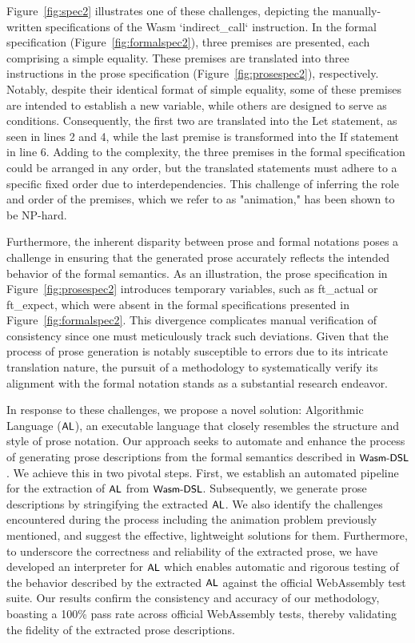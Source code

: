Figure~\ref{fig:spec2} illustrates one of these challenges, depicting the
manually-written specifications of the Wasm `indirect\_call` instruction. In
the formal specification (Figure~\ref{fig:formalspec2}), three premises are
presented, each comprising a simple equality. These premises are translated
into three instructions in the prose specification
(Figure~\ref{fig:prosespec2}), respectively. Notably, despite their identical
format of simple equality, some of these premises are intended to establish a
new variable, while others are designed to serve as conditions. Consequently,
the first two are translated into the Let statement, as seen in lines 2 and 4,
while the last premise is transformed into the If statement in line 6. Adding
to the complexity, the three premises in the formal specification could be
arranged in any order, but the translated statements must adhere to a specific
fixed order due to interdependencies. This challenge of inferring the role and
order of the premises, which we refer to as "animation," has been shown to be
NP-hard.

Furthermore, the inherent disparity between prose and formal notations poses a
challenge in ensuring that the generated prose accurately reflects the intended
behavior of the formal semantics. As an illustration, the prose specification
in Figure~\ref{fig:prosespec2} introduces temporary variables, such as
ft\_actual or ft\_expect, which were absent in the formal specifications
presented in Figure~\ref{fig:formalspec2}. This divergence complicates manual
verification of consistency since one must meticulously track such deviations.
Given that the process of prose generation is notably susceptible to errors due
to its intricate translation nature, the pursuit of a methodology to
systematically verify its alignment with the formal notation stands as a
substantial research endeavor.

In response to these challenges, we propose a novel solution: Algorithmic
Language ($\textsf{\small AL}$), an executable language that closely resembles the structure and
style of prose notation. Our approach seeks to automate and enhance the process
of generating prose descriptions from the formal semantics described in
$\textsf{\small Wasm-DSL}$. We achieve this in two pivotal steps. First, we establish an
automated pipeline for the extraction of $\textsf{\small AL}$ from $\textsf{\small Wasm-DSL}$. Subsequently, we
generate prose descriptions by stringifying the extracted $\textsf{\small AL}$. We also identify
the challenges encountered during the process including the animation problem
previously mentioned, and suggest the effective, lightweight solutions for
them. Furthermore, to underscore the correctness and reliability of the
extracted prose, we have developed an interpreter for $\textsf{\small AL}$ which enables
automatic and rigorous testing of the behavior described by the extracted $\textsf{\small AL}$
against the official WebAssembly test suite. Our results confirm the
consistency and accuracy of our methodology, boasting a 100\% pass rate across
official WebAssembly tests, thereby validating the fidelity of the extracted
prose descriptions.

